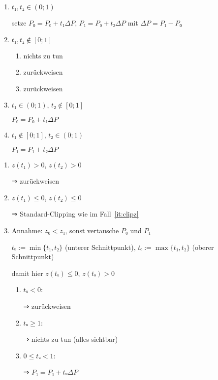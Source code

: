 \documentclass[a4paper,12pt]{scrartcl}
\begin{document}
\begin{enumerate}
\item $t₁,t₂ ∈ (0; 1)$
  
  

  setze $P₀ = P₀ + t₁ ΔP$, $P₁ = P₀ + t₂ ΔP$ mit $ΔP = P₁ - P₀$
\item $t₁, t₂ ∉ [0; 1]$
  \begin{enumerate}
  \item  nichts zu tun
  \item  zurückweisen
  \item  zurückweisen
  \end{enumerate}
\item $t₁ ∈ (0; 1)$, $t₂ ∉ [0; 1]$

   $P₀ = P₀ + t₁ ΔP$
\item $t₁ ∉ [0; 1]$, $t₂ ∈ (0; 1)$

   $P₁ = P₁ + t₂ ΔP$
\end{enumerate}


\begin{enumerate}
\item $z(t₁) > 0$, $z(t₂) > 0$

   \qquad ⇒ zurückweisen
\item $z(t₁) ≤ 0$, $z(t₂) ≤ 0$

   \qquad ⇒ Standard-Clipping wie im Fall~\ref{it:clipz}
  
  \pagebreak

\item Annahme: $z₀ < z₁$, sonst vertausche $P₀$ und $P₁$

  $tᵤ := \min\{t₁, t₂\}$ (unterer Schnittpunkt), $tₒ := \max\{t₁, t₂\}$ (oberer Schnittpunkt)

  damit hier $z(tᵤ) ≤ 0$, $z(tₒ) > 0$
  \begin{enumerate}
  \item $tᵤ < 0$:

     \qquad ⇒ zurückweisen
  \item $tᵤ ≥ 1$:

     \qquad ⇒ nichts zu tun (alles sichtbar)
  \item $0 ≤ tᵤ < 1$:

     \qquad ⇒ $P₁ = P₁ + tᵤ ΔP$
  \end{enumerate}
\end{enumerate}
\end{document}
